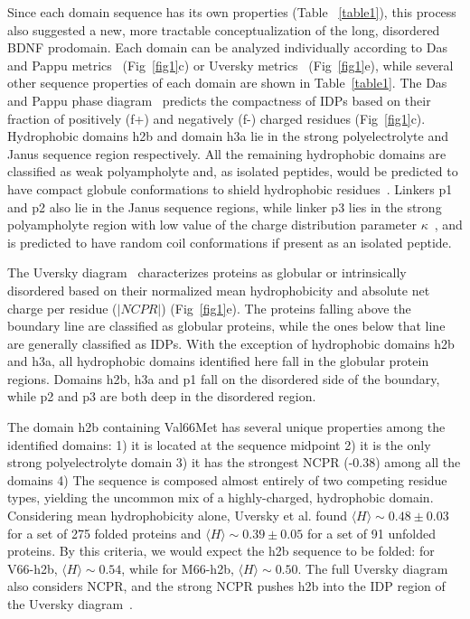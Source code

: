 \documentclass[10pt,letterpaper]{article}
\begin{document}
Since each domain sequence has its own properties (Table ~\ref{table1}), this process also suggested a new, more tractable conceptualization of the long, disordered BDNF prodomain. Each domain can be analyzed individually according to Das and Pappu metrics~\cite{Das2013a} (Fig~\ref{fig1}c) or Uversky metrics~\cite{Uversky2000a} (Fig~\ref{fig1}e), while several other sequence properties of each domain are shown in Table~\ref{table1}. %
The Das and Pappu phase diagram~\cite{Das2013a} predicts the compactness of IDPs based on their fraction of positively (f+) and negatively (f-) charged residues (Fig~\ref{fig1}c). Hydrophobic domains h2b and domain h3a lie in the strong polyelectrolyte and Janus sequence region respectively. All the remaining hydrophobic domains are classified as weak polyampholyte and, as isolated peptides, would be predicted to have compact globule conformations to shield hydrophobic residues~\cite{Das2013a}. Linkers p1 and p2 also lie in the Janus sequence regions, while linker p3 lies in the strong polyampholyte region with low value of the charge distribution parameter $\kappa$~\cite{Das2013a}, and is predicted to have random coil conformations if present as an isolated peptide.

The Uversky diagram~\cite{Uversky2000a} characterizes proteins as globular or intrinsically disordered based on their normalized mean hydrophobicity and absolute net charge per residue ($|NCPR|$) (Fig~\ref{fig1}e). The proteins falling above the boundary line are classified as globular proteins, while the ones below that line are generally classified as IDPs. With the exception of hydrophobic domains h2b and h3a, all hydrophobic domains identified here fall in the globular protein regions. Domains h2b, h3a and p1 fall on the disordered side of the boundary, while p2 and p3 are both deep in the disordered region.


The domain h2b containing Val66Met has several unique properties among the identified domains: 1) it is located at the sequence midpoint 2) it is the only strong polyelectrolyte domain 3) it has the strongest NCPR (-0.38) among all the domains 4) The sequence is composed almost entirely of two competing residue types, yielding the uncommon mix of a highly-charged, hydrophobic domain. Considering mean hydrophobicity alone, Uversky et al.\cite{Uversky2000a} found $\langle H \rangle\sim 0.48 \pm{0.03}$ for a set of 275 folded proteins and $\langle H \rangle\sim 0.39 \pm{0.05}$ for a set of 91 unfolded proteins. By this criteria, we would expect the h2b sequence to be folded: for V66-h2b, $\langle H \rangle \sim 0.54$, while for M66-h2b, $\langle H \rangle\sim0.50$. The full Uversky diagram also considers NCPR, and the strong NCPR pushes h2b into the IDP region of the Uversky diagram~\cite{Uversky2000a}. 
\end{document}
